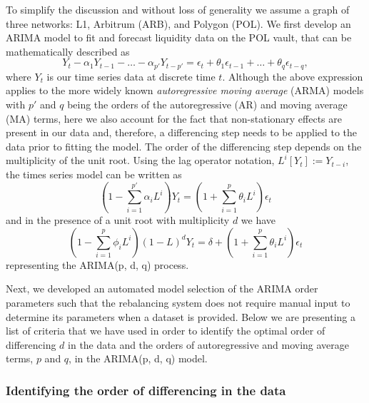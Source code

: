 To simplify the discussion and without loss of generality we assume a graph of three networks: L1, Arbitrum (ARB), and Polygon (POL).
%
We first develop an ARIMA model to fit and forecast liquidity data on the POL vault, that can be mathematically described as 
%
\begin{equation}
    Y_t - \alpha_1Y_{t-1} - \dots - \alpha_{p'}Y_{t-p'} = \epsilon_t + \theta_1\epsilon_{t-1} + \dots + \theta_q\epsilon_{t-q},
\end{equation}
%
where $Y_t$ is our time series data at discrete time $t$. Although the above expression applies to the more widely known \emph{autoregressive moving average} (ARMA) \cite{TimeScience} models with $p'$ and $q$ being the orders of the autoregressive (AR) and moving average (MA) terms, here we also account for the fact that non-stationary effects are present in our data and, therefore, a differencing step needs to be applied to the data prior to fitting the model.
%
The order of the differencing step depends on the multiplicity of the unit root. Using the lag operator notation, $L^i[Y_t] := Y_{t-i}$, the times series model can be written as 
%
\begin{equation}
    \left(1 - \sum_{i=1}^{p'} \alpha_i L^i\right) Y_t = \left(1 + \sum_{i=1}^p\theta_i L^i\right)\epsilon_t
\end{equation}
%
and in the presence of a unit root with multiplicity $d$ we have 
%
\begin{equation}
    \left(1 - \sum_{i=1}^{p} \phi_i L^i\right) (1 - L)^d Y_t = \delta + \left(1 + \sum_{i=1}^p\theta_i L^i\right)\epsilon_t
\end{equation}
%
representing the ARIMA(p, d, q) process.

Next, we developed an automated model selection of the ARIMA order parameters such that the rebalancing system does not require manual input to determine its parameters when a dataset is provided.
%
Below we are presenting a list of criteria that we have used in order to identify the optimal order of differencing $d$ in the data and the orders of autoregressive and moving average terms, $p$ and $q$, in the ARIMA(p, d, q) model. 

\subsubsection*{Identifying the order of differencing in the data}

